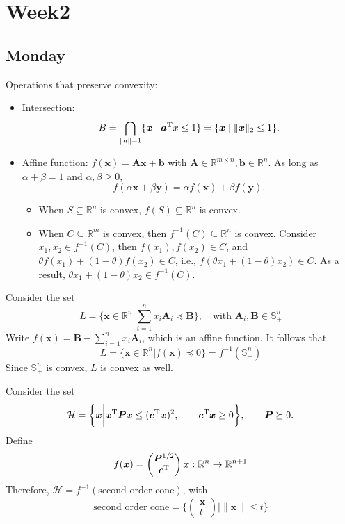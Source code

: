 
\chapter{Week2}

\section{Monday}
\label{Week2:Monday}


Operations that preserve convexity:
\begin{itemize}
\item
Intersection:
\[
B = \bigcap_{\|a\|=1}\{\bm x\mid \bm a^{\mathrm T} x\le1\}
=\{\bm x\mid \|\bm x\|_2\le 1\}.
\]
\item
Affine function: $f(\bm x) = \bm A\bm x + \bm b$
with $\bm A\in\mathbb{R}^{m\times n}, \bm b\in\mathbb{R}^n$.
As long as $\alpha+\beta=1$ and $\alpha,\beta\ge0$,
\[
f(\alpha\bm x+\beta\bm y)
=
\alpha f(\bm x) + \beta f(\bm y).
\]
\begin{itemize}
\item
When $S\subseteq\mathbb{R}^n$ is convex, $f(S)\subseteq \mathbb{R}^n$ is convex. 
\item
When $C\subseteq\mathbb{R}^m$ is convex, then $f^{-1}(C)\subseteq\mathbb{R}^n$ is convex.
Consider $x_1,x_2\in f^{-1}(C)$, then $f(x_1),f(x_2)\in C$, and $\theta f(x_1) + (1-\theta) f(x_2)\in C$, i.e., 
$f(\theta x_1 + (1-\theta)x_2)\in C$.
As a result, $\theta x_1 + (1-\theta)x_2\in f^{-1}(C)$.
\end{itemize}
\end{itemize}
\begin{example}
Consider the set
\[
L = \bigg\{
\bm x\in \mathbb{R}^n
\bigg|
\sum_{i=1}^nx_i\bm A_i\preceq\bm B
\bigg\},\quad
\text{with }\bm A_i,\bm B\in\mathbb{S}^n_+
\]
Write $f(\bm x) = \bm B - \sum_{i=1}^nx_i\bm A_i$, which is an affine function. 
It follows that
\[
L = \bigg\{
\bm x\in \mathbb{R}^n\bigg|
f(\bm x)\preceq0
\bigg\}
=
f^{-1}(\mathbb{S}^n_+)
\]
Since $\mathbb{S}^n_+$ is convex, $L$ is convex as well.
\end{example}

\begin{example}
Consider the set
\[
\mathcal{H}  =\bigg\{
\bm x\bigg|
\bm x^{\mathrm T}\bm P\bm x\le (\bm c^{\mathrm T}\bm x)^2,\qquad
\bm c^{\mathrm T}\bm x\ge0
\bigg\},\qquad \bm P\succeq0.
\]
Define 
\[
f(\bm x) = \begin{pmatrix}
\bm P^{1/2}\\\bm c^{\mathrm T}
\end{pmatrix}\bm x:
\mathbb{R}^n \to \mathbb{R}^{n+1}
\]
Therefore, $\mathcal{H} = f^{-1}(\text{second order cone})$, with
\[
\text{second order cone}=
\bigg\{\begin{pmatrix}
\bm x\\t
\end{pmatrix}\bigg|
\|\bm x\|\le t
\bigg\}
\]
\end{example}

